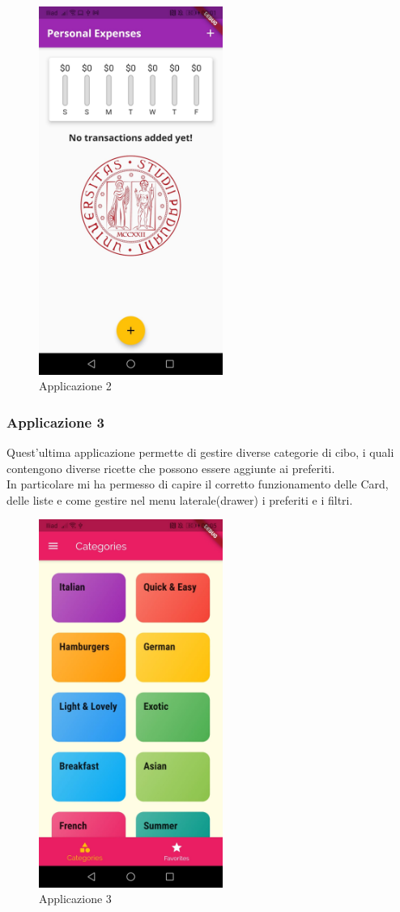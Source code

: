 \begin{figure}[htbp]	
	\centering
	\includegraphics[width=6cm]{immagini/app2.jpeg}
	\caption{Applicazione 2}
	\label{fig:Applicazione 2}
\end{figure}

\newpage

\subsubsection{Applicazione 3}
Quest'ultima applicazione permette di gestire diverse categorie di cibo, i quali contengono diverse ricette che possono essere aggiunte ai preferiti.\\
In particolare mi ha permesso di capire il corretto funzionamento delle Card, delle liste e come gestire nel menu laterale(drawer) i preferiti e i filtri.\\

\begin{figure}[htbp]	
	\centering
	\includegraphics[width=6cm]{immagini/app3.jpeg}
	\caption{Applicazione 3}
	\label{fig:Applicazione 3}
\end{figure}






